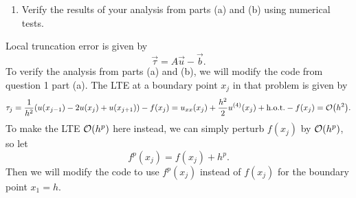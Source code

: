 \documentclass[12pt]{article}
\begin{document}
\begin{enumerate}[ \ \ (c)]
\item Verify the results of your analysis from parts (a) and (b) using numerical tests.
\end{enumerate}
Local truncation error is given by $$\vec{\tau} = A\vec{u} - \vec{b}.$$
To verify the analysis from parts (a) and (b), we will modify the code from question 1 part (a).  
The LTE at a boundary point $x_j$ in that problem is given by
$$\tau_j = \dfrac{1}{h^2}(u(x_{j-1}) -2u(x_j) + u(x_{j+1})) -f(x_j) = u_{xx}(x_j) + \dfrac{h^2}{2}u^{(4)}(x_j) + \text{h.o.t.} - f(x_j) = \order{h^2}.$$
To make the LTE $\order{h^p}$ here instead, we can simply perturb $f(x_j)$ by $\order{h^p}$, so let $$f^p(x_j) = f(x_j) + h^p.$$
Then we will modify the code to use $f^p(x_j)$ instead of $f(x_j)$ for the boundary point $x_1 = h$.
\end{document}
